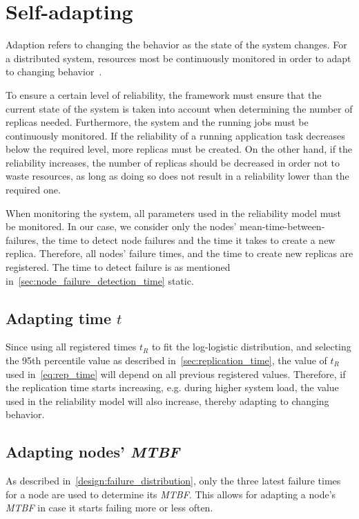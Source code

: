 \documentclass{cslthse-msc}
\begin{document}
\section{Self-adapting} \label{sec:design_self_adapting}
Adaption refers to changing the behavior as the state of the system changes. For a distributed system, resources most be continuously monitored in order to adapt to changing behavior~\cite{imprRelAdaptRL}.

To ensure a certain level of reliability, the framework must ensure that the current state of the system is taken into account when determining the number of replicas needed. Furthermore, the system and the running jobs must be continuously monitored. If the reliability of a running application task decreases below the required level, more replicas must be created. On the other hand, if the reliability increases, the number of replicas should be decreased in order not to waste resources, as long as doing so does not result in a reliability lower than the required one.

When monitoring the system, all parameters used in the reliability model must be monitored. In our case, we consider only the nodes' mean-time-between-failures, the time to detect node failures and the time it takes to create a new replica. Therefore, all nodes' failure times, and the time to create new replicas are registered. The time to detect failure is as mentioned in~\cref{sec:node_failure_detection_time} static.

\subsection{Adapting time $t$}
Since using all registered times $t_R$ to fit the log-logistic distribution, and selecting the 95th percentile value as described in~\cref{sec:replication_time}, the value of $t_R$ used in~\cref{eq:rep_time} will depend on all previous registered values. Therefore, if the replication time starts increasing, e.g. during higher system load, the value used in the reliability model will also increase, thereby adapting to changing behavior. 

\subsection{Adapting nodes' \emph{MTBF}} \label{sec:design_self_adapting_mtbf}
As described in~\cref{design:failure_distribution}, only the three latest failure times for a node are used to determine its \emph{MTBF}. This allows for adapting a node's \emph{MTBF} in case it starts failing more or less often. 
\end{document}

